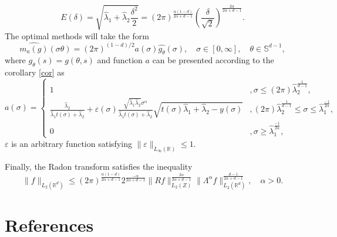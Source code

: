 \documentclass[12pt]{iopart}
\begin{document}
	$$
	E(\delta)=\sqrt{\widehat\lambda_1+\widehat\lambda_2\frac{\delta^2}{2}}=(2\pi)^{\frac{\alpha(1-d)}{2\alpha+d-1}}\left(\frac{\delta}{\sqrt{2}}\right)^{\frac{2\alpha}{2\alpha+d-1}}.
	$$
	The optimal methods will take the form 
	$$
	\widehat{m_a(g)}(\sigma\theta)=(2\pi)^{(1-d)/2}a(\sigma)\widehat{g_\theta }(\sigma),\quad \sigma\in[0,\infty],\quad \theta\in\mathbb S^{d-1},
	$$
	where $g_{\theta}(s)=g(\theta,s)$ and function $a$ can be presented according to the corollary \ref{cor} as
	$$
	a(\sigma)=
	\begin{cases}
	1& ,\sigma\leqslant (2\pi)\widehat\lambda_2^\frac{1}{d-1},\\
	\frac{\widehat\lambda_2}{\widehat\lambda_1t(\sigma)+\widehat\lambda_2}+\varepsilon(\sigma)\frac{\sqrt{\widehat\lambda_1\widehat\lambda_2}\sigma^\alpha}{\widehat\lambda_1t(\sigma)+\widehat\lambda_2}\sqrt{t(\sigma)\widehat\lambda_1+\widehat\lambda_2-y(\sigma)}& ,(2\pi)\widehat\lambda_2^\frac{1}{d-1} \leqslant\sigma\leqslant\widehat\lambda_1^{\frac{-1}{2\alpha}},\\
	0 &,\sigma\geqslant\widehat\lambda_1^{\frac{-1}{2\alpha}},
	\end{cases}
	$$
	$\varepsilon$ is an arbitrary function satisfying $\|\varepsilon\|_{L_\infty(\mathbb R)}\leqslant 1$.
	
	Finally, the Radon transform satisfies the inequality
	$$
	\|f\|_{L_2(\mathbb R^d)}\leqslant
	(2\pi)^{\frac{\alpha(1-d)}{2\alpha+d-1}}2^{\frac{-\alpha}{2\alpha+d-1}}\|Rf\|_{L_2(Z)}^{\frac{2\alpha}{2\alpha+d-1}}\|\Lambda^\alpha f\|_{L_2(\mathbb
		R^d)}^\frac{d-1}{2\alpha+d-1},\quad \alpha>0.
	$$
	
	
	
	
	\section*{References}
	
	
	
\end{document}
